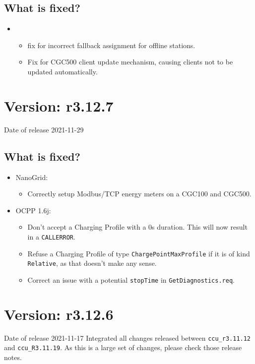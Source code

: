 \documentclass{scrartcl}
\begin{document}
\subsection*{What is fixed?}
\begin{itemize}
\item \nanogrid\
    \begin{itemize}
    \item fix for incorrect fallback assignment for offline stations.
    \item Fix for CGC500 client update mechanism, causing clients not to be updated automatically.
    \end{itemize}
\end{itemize}

\section{Version: r3.12.7}
Date of release 2021-11-29
\subsection*{What is fixed?}
\begin{itemize}
\item NanoGrid:
  \begin{itemize}
  \item Correctly setup Modbus/TCP energy meters on a CGC100 and CGC500.
  \end{itemize}
\item OCPP 1.6j:
  \begin{itemize}
  \item Don't accept a Charging Profile with a 0s duration. This will now
    result in a \verb|CALLERROR|.
  \item Refuse a Charging Profile of type \verb|ChargePointMaxProfile| if it
    is of kind \verb|Relative|, as that doesn't make any sense.
  \item Correct an issue with a potential \verb|stopTime| in
    \verb|GetDiagnostics.req|.
  \end{itemize}
\end{itemize}

\section{Version: r3.12.6}
Date of release 2021-11-17
Integrated all changes released between \verb|ccu_r3.11.12| and
\verb|ccu_R3.11.19|. As this is a large set of changes, please check those
release notes.
\end{document}
